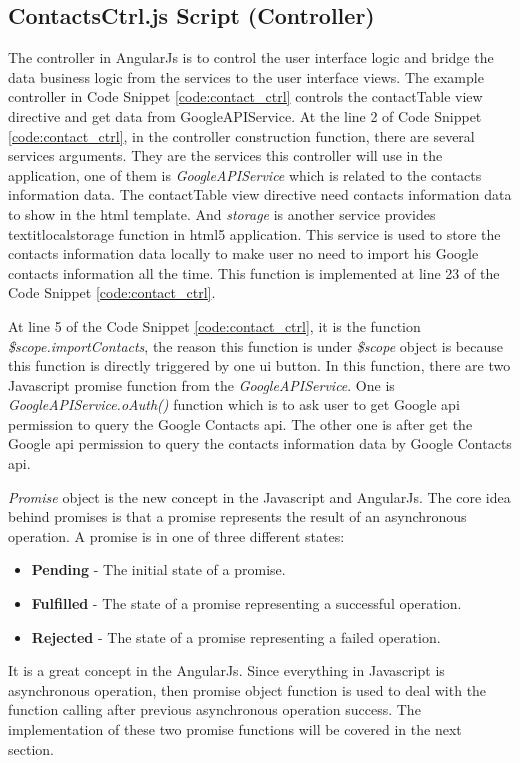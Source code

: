 \subsection{ContactsCtrl.js Script (Controller)}

\par The controller in AngularJs is to control the user interface logic and bridge the data business logic from the services to the user interface views. The example controller in Code Snippet \ref{code:contact_ctrl} controls the contactTable view directive and get data from GoogleAPIService. At the line 2 of Code Snippet \ref{code:contact_ctrl}, in the controller construction function, there are several services arguments. They are the services this controller will use in the application, one of them is \textit{GoogleAPIService} which is related to the contacts information data. The contactTable view directive need contacts information data to show in the \gls{html} template. And \textit{storage} is another service provides \\textit{localstorage} function in \gls{html5} application. This service is used to store the contacts information data locally to make user no need to import his Google contacts information all the time. This function is implemented at line 23 of the Code Snippet \ref{code:contact_ctrl}.

\par At line 5 of the Code Snippet \ref{code:contact_ctrl}, it is the function \textit{\$scope.importContacts}, the reason this function is under \textit{\$scope} object is because this function is directly triggered by one \gls{ui} button. In this function, there are two Javascript promise function from the \textit{GoogleAPIService}. One is \textit{GoogleAPIService.oAuth()} function which is to ask user to get Google \gls{api} permission to query the Google Contacts \gls{api}. The other one is after get the Google \gls{api} permission to query the contacts information data by Google Contacts \gls{api}.

\par \textit{Promise} object is the new concept in the Javascript and AngularJs. The core idea behind promises is that a promise represents the result of an asynchronous operation. A promise is in one of three different states:\cite{website:promise}
\begin{itemize}[topsep=-1em,parsep=0em,itemsep=0em]
 \item \textbf{Pending} - The initial state of a promise.
 \item \textbf{Fulfilled} - The state of a promise representing a successful operation.
 \item \textbf{Rejected} - The state of a promise representing a failed operation.
\end{itemize}
It is a great concept in the AngularJs. Since everything in Javascript is asynchronous operation, then promise object function is used to deal with the function calling after previous asynchronous operation success. The implementation of these two promise functions will be covered in the next section.

